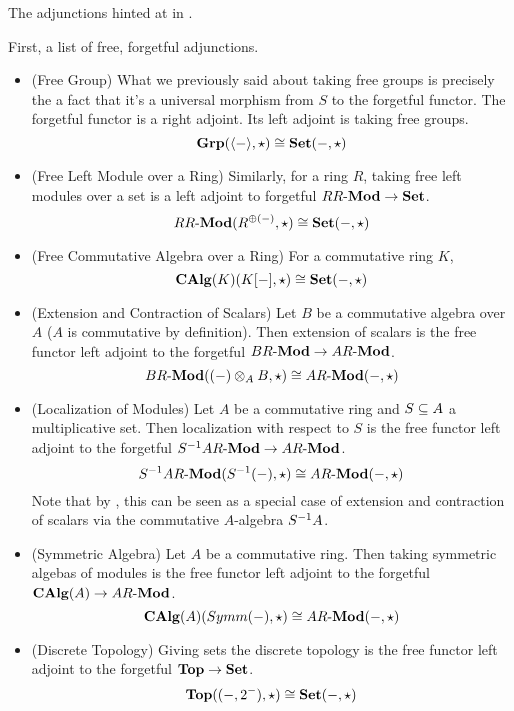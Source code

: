 \begin{eg}[Adjunctions]
  
  The adjunctions hinted at in .

  First, a list of free, forgetful adjunctions.
  \begin{itemize}
    \item (Free Group) 
    What we previously said about taking free groups is precisely 
    the a fact that it's a universal morphism from $S$ to the forgetful functor.
    The forgetful functor is a right adjoint.
    Its left adjoint is taking free groups. 
    \[
      \mathbf{Grp}(\langle-\rangle,\star) \cong \mathbf{Set}(-,\star)
    \]
    \item (Free Left Module over a Ring) Similarly, 
    for a ring $R$, 
    taking free left modules over a set is a left adjoint to forgetful 
    $RR\text{-}\mathbf{Mod} \to \mathbf{Set}$. 
    \[
      RR\text{-}\mathbf{Mod}(R^{\oplus(-)},\star) \cong \mathbf{Set}(-,\star)
    \]
    \item (Free Commutative Algebra over a Ring)
    For a commutative ring $K$, \[
      \mathbf{CAlg}(K)(K[-],\star) \cong \mathbf{Set}(-,\star)
    \]
    \item (Extension and Contraction of Scalars)
    Let $B$ be a commutative algebra over $A$ 
    ($A$ is commutative by definition).
    Then extension of scalars is the free functor left adjoint to
    the forgetful $BR\text{-}\mathbf{Mod} \to AR\text{-}\mathbf{Mod}$. \[
      BR\text{-}\mathbf{Mod}((-) \otimes_A B, \star) \cong AR\text{-}\mathbf{Mod}(-,\star)
    \]
    \item (Localization of Modules)
    Let $A$ be a commutative ring and $S \subseteq A$ a multiplicative set. 
    Then localization with respect to $S$ is the free functor
    left adjoint to the forgetful $S^{-1} A R\text{-}\mathbf{Mod} \to AR\text{-}\mathbf{Mod}$. \[
      S^{-1} AR\text{-}\mathbf{Mod}(S^{-1}(-), \star) \cong AR\text{-}\mathbf{Mod}(-,\star)
    \]
    Note that by ,
    this can be seen as a special case of extension and contraction of scalars
    via the commutative $A$-algebra $S^{-1} A$.

    \item (Symmetric Algebra)
    Let $A$ be a commutative ring. 
    Then taking symmetric algebas of modules is the free functor 
    left adjoint to the forgetful $\mathbf{CAlg}(A) \to AR\text{-}\mathbf{Mod}$.
    \[
      \mathbf{CAlg}(A)(Symm(-),\star) \cong AR\text{-}\mathbf{Mod}(-,\star)
    \]

    \item (Discrete Topology)
    Giving sets the discrete topology is the free functor left adjoint to 
    the forgetful $\mathbf{Top} \to \mathbf{Set}$. 
    \[
      \mathbf{Top}((-,2^-),\star) \cong \mathbf{Set}(-,\star)
    \]


\end{itemize}
\end{eg}

